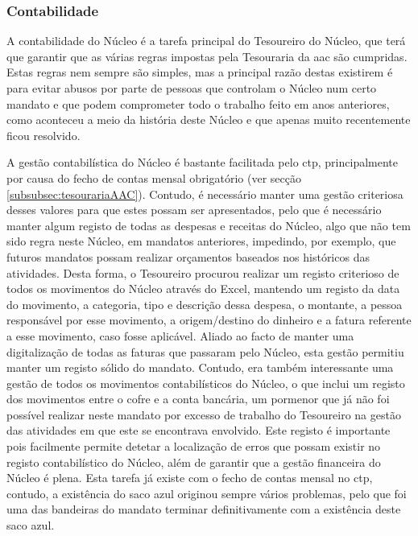 
\subsubsection{Contabilidade}

A contabilidade do Núcleo é a tarefa principal do Tesoureiro do Núcleo, que terá que garantir que as várias regras impostas pela Tesouraria da \acrshort{aac} são cumpridas. Estas regras nem sempre são simples, mas a principal razão destas existirem é para evitar abusos por parte de pessoas que controlam o Núcleo num certo mandato e que podem comprometer todo o trabalho feito em anos anteriores, como aconteceu a meio da história deste Núcleo e que apenas muito recentemente ficou resolvido.

A gestão contabilística do Núcleo é bastante facilitada pelo \acrshort{ctp}, principalmente por causa do fecho de contas mensal obrigatório (ver secção \ref{subsubsec:tesourariaAAC}). Contudo, é necessário manter uma gestão criteriosa desses valores para que estes possam ser apresentados, pelo que é necessário manter algum registo de todas as despesas e receitas do Núcleo, algo que não tem sido regra neste Núcleo, em mandatos anteriores, impedindo, por exemplo, que futuros mandatos possam realizar orçamentos baseados nos históricos das atividades. Desta forma, o Tesoureiro procurou realizar um registo criterioso de todos os movimentos do Núcleo através do Excel, mantendo um registo da data do movimento, a categoria, tipo e descrição dessa despesa, o montante, a pessoa responsável por esse movimento, a origem/destino do dinheiro e a fatura referente a esse movimento, caso fosse aplicável. Aliado ao facto de manter uma digitalização de todas as faturas que passaram pelo Núcleo, esta gestão permitiu manter um registo sólido do mandato. Contudo, era também interessante uma gestão de todos os movimentos contabilísticos do Núcleo, o que inclui um registo dos movimentos entre o cofre e a conta bancária, um pormenor que já não foi possível realizar neste mandato por excesso de trabalho do Tesoureiro na gestão das atividades em que este se encontrava envolvido. Este registo é importante pois facilmente permite detetar a localização de erros que possam existir no registo contabilístico do Núcleo, além de garantir que a gestão financeira do Núcleo é plena. Esta tarefa já existe com o fecho de contas mensal no \acrshort{ctp}, contudo, a existência do saco azul originou sempre vários problemas, pelo que foi uma das bandeiras do mandato terminar definitivamente com a existência deste saco azul.

